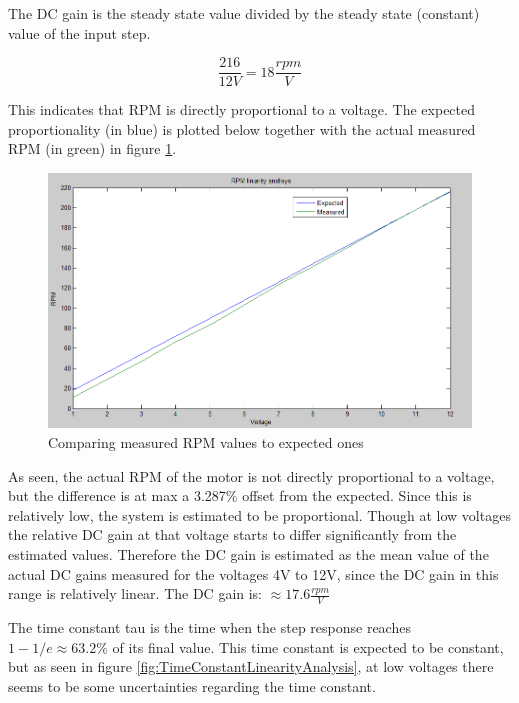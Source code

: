 The DC gain is the steady state value divided by the steady state (constant) value of the input step.

\begin{equation}
\frac{216}{12V}=18\frac{rpm}{V}
\end{equation}

This indicates that RPM is directly proportional to a voltage. The expected proportionality (in blue) is plotted below together with the actual measured RPM (in green) in figure \ref{fig:RPMLinearityAnalysis}.

\begin{figure}[h!]
\centering
\includegraphics[scale=0.4]{Billeder/RPMLinearityAnalysis.png}
\caption{Comparing measured RPM values to expected ones}
\label{fig:RPMLinearityAnalysis}
\end{figure}

As seen, the actual RPM of the motor is not directly proportional to a voltage, but the difference is at max a 3.287\% offset from the expected. Since this is relatively low, the system is estimated to be proportional. Though at low voltages the relative DC gain at that voltage starts to differ significantly from the estimated values. Therefore the DC gain is estimated as the mean value of the actual DC gains measured for the voltages 4V to 12V, since the DC gain in this range is relatively linear. The DC gain is: $\approx 17.6\frac{rpm}{V}$

The time constant tau is the time when the step response reaches $1-1/e\approx63.2\%$ of its final value. This time constant is expected to be constant, but as seen in figure \ref{fig:TimeConstantLinearityAnalysis}, at low voltages there seems to be some uncertainties regarding the time constant.

